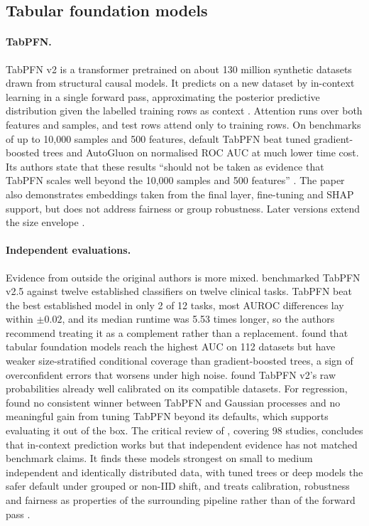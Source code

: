 \documentclass[11pt]{article}
\begin{document}
\subsection{Tabular foundation models}

\paragraph{TabPFN.} TabPFN v2 is a transformer pretrained on about 130 million synthetic datasets drawn from structural causal models. It predicts on a new dataset by in-context learning in a single forward pass, approximating the posterior predictive distribution given the labelled training rows as context \citep[p.~2]{hollmann2025accurate}. Attention runs over both features and samples, and test rows attend only to training rows. On benchmarks of up to 10,000 samples and 500 features, default TabPFN beat tuned gradient-boosted trees and AutoGluon on normalised ROC AUC at much lower time cost. Its authors state that these results ``should not be taken as evidence that TabPFN scales well beyond the 10,000 samples and 500 features'' \citep[p.~6]{hollmann2025accurate}. The paper also demonstrates embeddings taken from the final layer, fine-tuning and SHAP support, but does not address fairness or group robustness. Later versions extend the size envelope \citep{jiang2026representation, kurashkin2026current}.

\paragraph{Independent evaluations.} Evidence from outside the original authors is more mixed. \citet{shaktah2026established} benchmarked TabPFN v2.5 against twelve established classifiers on twelve clinical tasks. TabPFN beat the best established model in only 2 of 12 tasks, most AUROC differences lay within $\pm 0.02$, and its median runtime was 5.53 times longer, so the authors recommend treating it as a complement rather than a replacement. \citet{costa2026high} found that tabular foundation models reach the highest AUC on 112 datasets but have weaker size-stratified conditional coverage than gradient-boosted trees, a sign of overconfident errors that worsens under high noise. \citet{sabanovic2026calibration} found TabPFN v2's raw probabilities already well calibrated on its compatible datasets. For regression, \citet{johnson2026uncertainty} found no consistent winner between TabPFN and Gaussian processes and no meaningful gain from tuning TabPFN beyond its defaults, which supports evaluating it out of the box. The critical review of \citet{kurashkin2026current}, covering 98 studies, concludes that in-context prediction works but that independent evidence has not matched benchmark claims. It finds these models strongest on small to medium independent and identically distributed data, with tuned trees or deep models the safer default under grouped or non-IID shift, and treats calibration, robustness and fairness as properties of the surrounding pipeline rather than of the forward pass \citep[pp.~22--23]{kurashkin2026current}.
\end{document}
